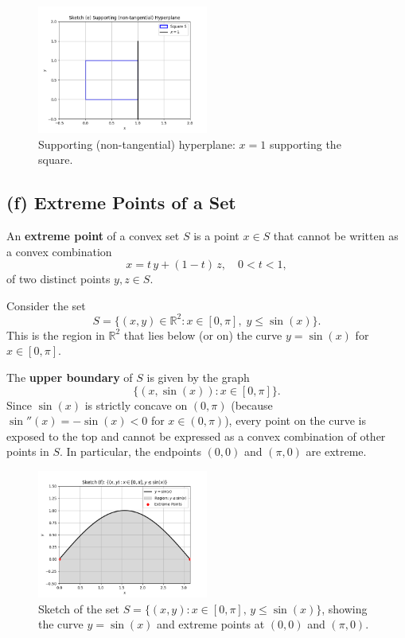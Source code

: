 \documentclass{article}
\begin{document}
\begin{figure}[H]
    \centering
    \includegraphics[width=0.5\textwidth]{e_supporting.png}
    \caption{Supporting (non-tangential) hyperplane: $x=1$ supporting the square.}
\end{figure}

\subsection*{(f) Extreme Points of a Set}

An \textbf{extreme point} of a convex set $S$ is a point $x \in S$ that cannot be written as a convex combination
\[
x = t\,y + (1-t)\,z, \quad 0 < t < 1,
\]
of two distinct points $y, z \in S$.

Consider the set
\[
S = \{ (x,y) \in \mathbb{R}^2 : x \in [0,\pi],\; y \le \sin(x) \}.
\]
This is the region in $\mathbb{R}^2$ that lies below (or on) the curve $y=\sin(x)$ for $x \in [0,\pi]$.

The \textbf{upper boundary} of $S$ is given by the graph
\[
\{ (x, \sin(x)) : x \in [0,\pi] \}.
\]
Since $\sin(x)$ is strictly concave on $(0,\pi)$ (because $\sin''(x) = -\sin(x) < 0$ for $x\in(0,\pi)$), every point on the curve is exposed to the top and cannot be expressed as a convex combination of other points in $S$. In particular, the endpoints $(0,0)$ and $(\pi,0)$ are extreme.

\begin{figure}[H]
    \centering
    \includegraphics[width=0.5\textwidth]{f.png}
    \caption{Sketch of the set $S = \{(x,y): x\in[0,\pi],\, y \le \sin(x)\}$, showing the curve $y=\sin(x)$ and extreme points at $(0,0)$ and $(\pi,0)$.}
\end{figure}
\end{document}
